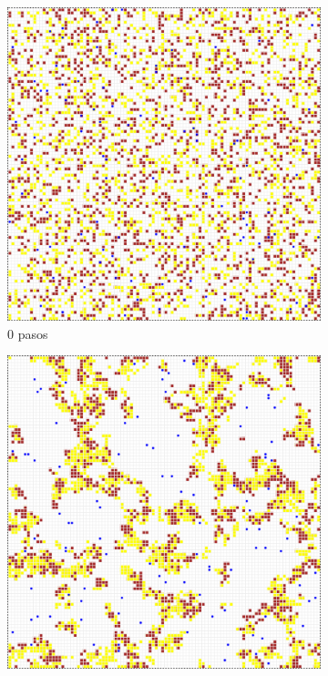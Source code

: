 \documentclass{article}
\begin{document}
\begin{figure}
  \centering
  \begin{subfigure}{0.3\textwidth}
    \includegraphics[width=\textwidth]{imgs/termites-chips1.png}
    \caption{0 pasos}
  \end{subfigure}
  \begin{subfigure}{0.3\textwidth}
    \includegraphics[width=\textwidth]{imgs/termites-chips3.png}

\end{subfigure}
\end{figure}
\end{document}

